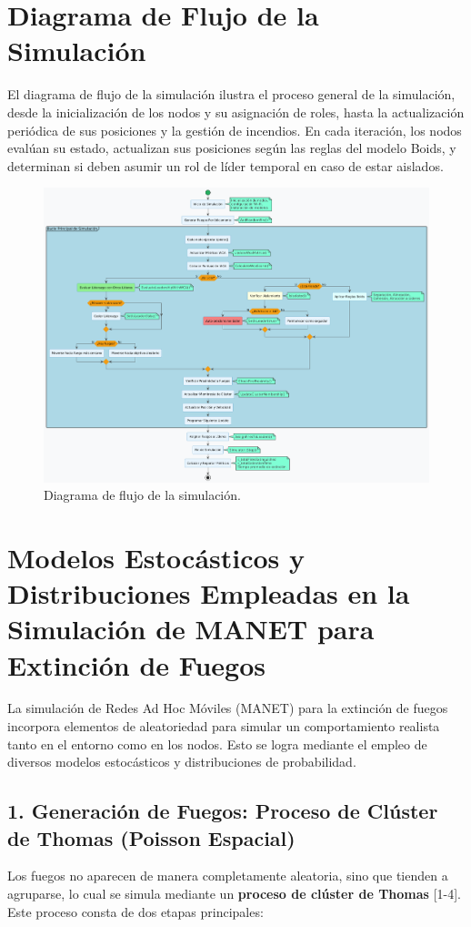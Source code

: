 \documentclass{article}
\begin{document}
\section{Diagrama de Flujo de la Simulación}
El diagrama de flujo de la simulación ilustra el proceso general de la simulación, desde la inicialización de los nodos y su asignación de roles, hasta la actualización periódica de sus posiciones y la gestión de incendios. En cada iteración, los nodos evalúan su estado, actualizan sus posiciones según las reglas del modelo Boids, y determinan si deben asumir un rol de líder temporal en caso de estar aislados.
\begin{figure}[H]
    \centering
    \includegraphics[width=1\textwidth]{flow_simulation_diagram.png}
    \caption{Diagrama de flujo de la simulación.}
    \label{fig:uml-flow}
\end{figure}

\section{Modelos Estocásticos y Distribuciones Empleadas en la Simulación de MANET para Extinción de Fuegos}

La simulación de Redes Ad Hoc Móviles (MANET) para la extinción de fuegos incorpora elementos de aleatoriedad para simular un comportamiento realista tanto en el entorno como en los nodos. Esto se logra mediante el empleo de diversos modelos estocásticos y distribuciones de probabilidad.

\subsection*{1. Generación de Fuegos: Proceso de Clúster de Thomas (Poisson Espacial)}
Los fuegos no aparecen de manera completamente aleatoria, sino que tienden a agruparse, lo cual se simula mediante un \textbf{proceso de clúster de Thomas} [1-4]. Este proceso consta de dos etapas principales:
\end{document}
